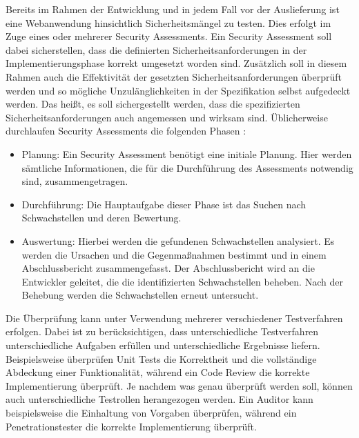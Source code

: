 \documentclass[12pt,oneside,a4paper,parskip]{scrbook}
\begin{document}
  Bereits im Rahmen der Entwicklung und in jedem Fall vor der Auslieferung ist eine Webanwendung
  hinsichtlich Sicherheitsmängel zu testen. Dies erfolgt im Zuge eines oder mehrerer Security Assessments.
  Ein Security Assessment soll dabei sicherstellen, dass die definierten Sicherheitsanforderungen in der
  Implementierungsphase korrekt umgesetzt worden sind. Zusätzlich soll in diesem Rahmen auch die
  Effektivität der gesetzten Sicherheitsanforderungen überprüft werden und so mögliche Unzulänglichkeiten
  in der Spezifikation selbst aufgedeckt werden. Das heißt, es soll sichergestellt werden, dass die spezifizierten
  Sicherheitsanforderungen auch angemessen und wirksam sind.
  Üblicherweise durchlaufen Security Assessments die folgenden Phasen \cite{BSI}:
  \begin{itemize}
    \item Planung: Ein Security Assessment benötigt eine initiale Planung. Hier werden sämtliche
    Informationen, die für die Durchführung des Assessments notwendig sind, zusammengetragen.
    \item Durchführung: Die Hauptaufgabe dieser Phase ist das Suchen nach Schwachstellen und deren
    Bewertung.
    \item Auswertung: Hierbei werden die gefundenen Schwachstellen analysiert. Es werden die Ursachen
    und die Gegenmaßnahmen bestimmt und in einem Abschlussbericht zusammengefasst. Der
    Abschlussbericht wird an die Entwickler geleitet, die die identifizierten Schwachstellen beheben.
    Nach der Behebung werden die Schwachstellen erneut untersucht.
  \end{itemize}
  Die Überprüfung kann unter Verwendung mehrerer verschiedener Testverfahren erfolgen. Dabei ist zu
  berücksichtigen, dass unterschiedliche Testverfahren unterschiedliche Aufgaben erfüllen und
  unterschiedliche Ergebnisse liefern. Beispielsweise überprüfen Unit Tests die Korrektheit und die
  vollständige Abdeckung einer Funktionalität, während ein Code Review die korrekte Implementierung
  überprüft. Je nachdem was genau überprüft werden soll, können auch unterschiedliche Testrollen
  herangezogen werden. Ein Auditor kann beispielsweise die Einhaltung von Vorgaben überprüfen, während
  ein Penetrationstester die korrekte Implementierung überprüft.
\end{document}
